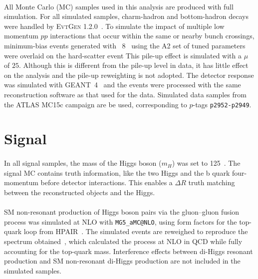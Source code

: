 \paragraph{}
All Monte Carlo (MC) samples used in this analysis are produced with full simulation.
For all simulated samples, charm-hadron and bottom-hadron decays were handled by {\textsc{EvtGen}} 1.2.0~\cite{EvtGen}. 
To simulate the impact of multiple low momentum $pp$ interactions that occur within the same or nearby bunch crossings, minimum-bias events generated with \pythia~8~\cite{Sjostrand:2006za} using the A2 set of tuned parameters~\cite{MC12AU2} were overlaid on the hard-scatter event
This pile-up effect is simulated with a $\mu$ of $25$.
Although this is different from the pile-up level in data, it has little effect on the analysis and the pile-up reweighting is not adopted.
The detector response was simulated with GEANT~4~\cite{Agostinelli:2002hh, Aad:2010ah} and the events were processed with the same reconstruction software as that used for the data.  
Simulated data samples from the ATLAS MC15c campaign are be used, corresponding to $p$-tags \texttt{p2952-p2949}.

\section{Signal}
\paragraph{}
In all signal samples, the mass of the Higgs boson ($m_H$) was set to 125~\GeV. 
The signal MC contains truth information, like the two Higgs and the b quark four-momentum before detector interactions. 
This enables a $\Delta R$ truth matching between the reconstructed objects and the Higgs.

\paragraph{}
SM non-resonant production of Higgs boson pairs via the gluon--gluon fusion process was simulated at NLO with \texttt{MG5\_aMC@NLO}, using form factors for the top-quark loop from HPAIR~\cite{PhysRevD.58.115012, Plehn199646}. The simulated events are reweighed to reproduce the \mhh spectrum obtained~\cite{Borowka:2016ehy, Borowka:2016ypz}, which calculated the process at NLO in QCD while fully accounting for the top-quark mass. 
Interference effects between di-Higgs resonant production and SM non-resonant di-Higgs production are not included in the simulated samples. 

